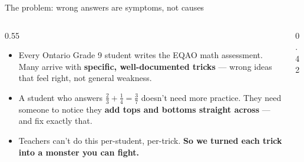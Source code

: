 \documentclass[aspectratio=169,11pt]{beamer}
\begin{document}
\begin{frame}{The problem: wrong answers are symptoms, not causes}
  \begin{columns}[T]
    \begin{column}{0.55\textwidth}
      \begin{itemize}\setlength\itemsep{0.7em}
        \item Every Ontario Grade 9 student writes the EQAO math assessment. Many arrive with \textbf{specific, well-documented tricks} --- wrong ideas that feel right, not general weakness.
        \item A student who answers $\tfrac{2}{3}+\tfrac{1}{4}=\tfrac{3}{7}$ doesn't need more practice. They need someone to notice they \textbf{add tops and bottoms straight across} --- and fix exactly that.
        \item Teachers can't do this per-student, per-trick. \textbf{So we turned each trick into a monster you can fight.}
      \end{itemize}
    \end{column}
    \begin{column}{0.42\textwidth}
    \end{column}
  \end{columns}
\end{frame}
\end{document}
